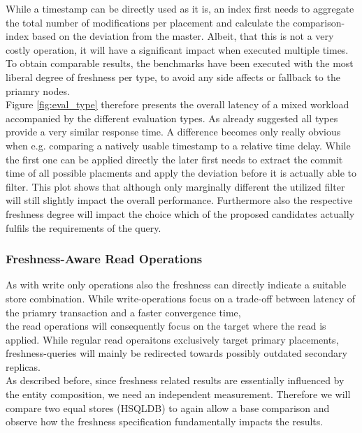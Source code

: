 While a timestamp can be directly used as it is, an index first needs to aggregate the total number of modifications per placement and 
calculate the comparison-index based on the deviation from the master.
Albeit, that this is not a very costly operation, it will have a significant impact when executed multiple times.
To obtain comparable results, the benchmarks have been executed with the most liberal degree of freshness per type, to avoid any side affects or fallback to the priamry nodes.\\
Figure \ref{fig:eval_type} therefore presents the overall latency of a mixed workload accompanied by the different evaluation types.
As already suggested all types provide a very similar response time. A difference becomes only really obvious when e.g. comparing a natively usable
timestamp to a relative time delay. While the first one can be applied directly the later first
needs to extract the commit time of all possible placments and apply the deviation before it is actually able to filter.
This plot shows that although only marginally different the utilized filter will still slightly impact the overall performance.
Furthermore also the respective freshness degree will impact the choice which of the proposed candidates actually fulfils the requirements of the query.





\subsubsection{Freshness-Aware Read Operations}

As with write only operations also the freshness can directly indicate a suitable store combination.
While write-operations focus on a trade-off between latency of the priamry transaction and a faster convergence time,\\
the read operations will consequently focus on the target where the read is applied. While regular read operaitons exclusively target
primary placements, freshness-queries will mainly be redirected towards possibly outdated secondary replicas.\\


As described before, since freshness related results are essentially influenced by the entity composition, we need an independent measurement.
Therefore we will  compare two equal stores (HSQLDB) to again allow a base comparison and observe how the freshness specification fundamentally impacts the results.\\


